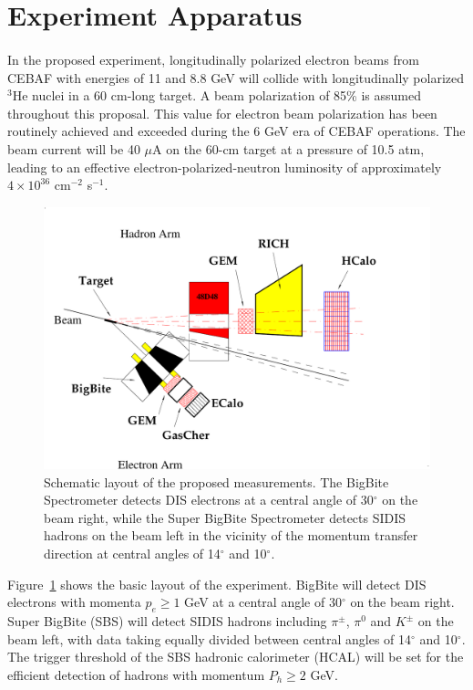 \section{Experiment Apparatus}
\paragraph{}
In the proposed experiment, longitudinally polarized electron beams from CEBAF with energies of 11 and 8.8 GeV will collide with longitudinally polarized $^3$He nuclei in a 60 cm-long target. A beam polarization of 85\% is assumed throughout this proposal. This value for electron beam polarization has been routinely achieved and exceeded during the 6 GeV era of CEBAF operations. The beam current will be 40 $\mu$A on the 60-cm target at a pressure of 10.5 atm, leading to an effective electron-polarized-neutron luminosity of approximately $4\times 10^{36}$ cm$^{-2}$ s$^{-1}$. 
\begin{figure}[h]
  \begin{center}
    \includegraphics[width=.75\textwidth]{figures/SIDIS_layout.pdf}
  \end{center}
  \caption{\label{fig:cartoon} Schematic layout of the proposed measurements. The BigBite Spectrometer detects DIS electrons at a central angle of 30$^\circ$ on the beam right, while the Super BigBite Spectrometer detects SIDIS hadrons on the beam left in the vicinity of the momentum transfer direction at central angles of 14$^\circ$ and 10$^\circ$.}
\end{figure}
Figure~\ref{fig:cartoon} shows the basic layout of the experiment. BigBite will detect DIS electrons with momenta $p_e \ge 1$ GeV at a central angle of 30$^\circ$ on the beam right. Super BigBite (SBS) will detect SIDIS hadrons including $\pi^\pm$, $\pi^0$ and $K^\pm$ on the beam left, with data taking equally divided between central angles of 14$^\circ$ and 10$^\circ$. The trigger threshold of the SBS hadronic calorimeter (HCAL) will be set for the efficient detection of hadrons with momentum $P_h \ge 2$ GeV. 

